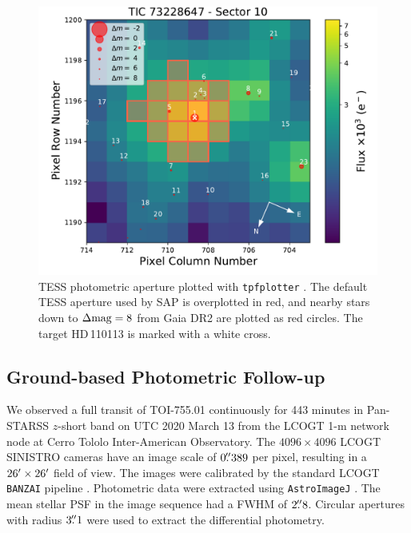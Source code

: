 \documentclass[fleqn,usenatbib]{mnras}
\newcommand{\Tstar}{HD\,110113}
\begin{document}
\begin{figure}
    \centering
    \includegraphics[width=\columnwidth, trim={0 0.8cm 1.8cm 0.1cm}]{TPF_Gaia_TIC73228647_S10}
    \caption{TESS photometric aperture plotted with \texttt{tpfplotter} \citep{2020A&A...635A.128A}. The default TESS aperture used by SAP is overplotted in red, and nearby stars down to $\Delta{\rm mag}=8$ from Gaia DR2 \citep{brown2018gaia} are plotted as red circles. The target \Tstar{} is marked with a white cross.}
    \label{fig:tpf}
\end{figure}

\subsection{Ground-based Photometric Follow-up}\label{sect:groundfu}
We observed a full transit of TOI-755.01 continuously for 443 minutes in Pan-STARSS $z$-short band on UTC 2020 March 13 from the LCOGT \citep{Brown:2013} 1-m network node at Cerro Tololo Inter-American Observatory.
The $4096\times4096$ LCOGT SINISTRO cameras have an image scale of $0\hbox{$.\!\!^{\prime\prime}$}389$ per pixel, resulting in a $26\hbox{$^\prime$}\times26\hbox{$^\prime$}$ field of view.
The images were calibrated by the standard LCOGT {\tt BANZAI} pipeline \citep{McCully:2018}.
Photometric data were extracted using {\tt AstroImageJ} \citep{Collins:2017}.
The mean stellar PSF in the image sequence had a FWHM of $2\hbox{$.\!\!^{\prime\prime}$}8$.
Circular apertures with radius $3\hbox{$.\!\!^{\prime\prime}$}1$ were used to extract the differential photometry.
\end{document}
